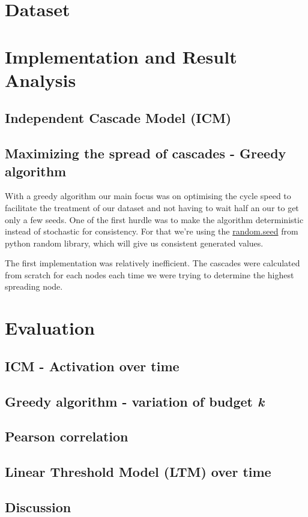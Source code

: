 
\section{Dataset}

\section{Implementation and Result Analysis}

\subsection{Independent Cascade Model (ICM)}

\subsection{Maximizing the spread of cascades - Greedy algorithm}

With a greedy algorithm our main focus was on optimising the cycle speed to facilitate the treatment of our dataset and not having to wait half an our to get only a few seeds.
One of the first hurdle was to make the algorithm deterministic instead of stochastic for consistency. For that we're using the \href{https://docs.python.org/3.8/library/random.html#random.seed}{random.seed} from python random library, which will give us consistent generated values.

The first implementation was relatively inefficient. The cascades were calculated from scratch for each nodes each time we were trying to determine the highest spreading node.
\section{Evaluation}

\subsection{ICM - Activation over time}

\subsection{Greedy algorithm - variation of budget \textit{k}}

\subsection{Pearson correlation}

\subsection{Linear Threshold Model (LTM) over time}

\subsection{Discussion}
